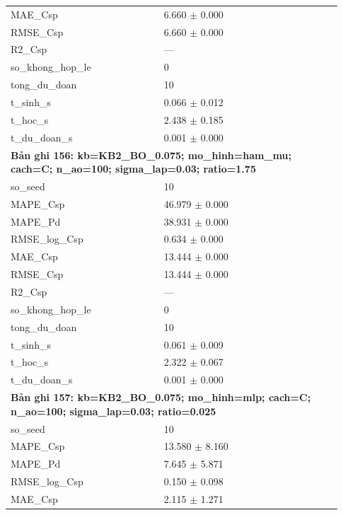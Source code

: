 \begin{longtable}{p{0.43\linewidth}p{0.50\linewidth}}
MAE\_\allowbreak Csp & 6.660 $\pm$ 0.000 \\
RMSE\_\allowbreak Csp & 6.660 $\pm$ 0.000 \\
R2\_\allowbreak Csp & — \\
so\_\allowbreak khong\_\allowbreak hop\_\allowbreak le & 0 \\
tong\_\allowbreak du\_\allowbreak doan & 10 \\
t\_\allowbreak sinh\_\allowbreak s & 0.066 $\pm$ 0.012 \\
t\_\allowbreak hoc\_\allowbreak s & 2.438 $\pm$ 0.185 \\
t\_\allowbreak du\_\allowbreak doan\_\allowbreak s & 0.001 $\pm$ 0.000 \\
\midrule
\multicolumn{2}{p{0.95\linewidth}}{\textbf{Bản ghi 156: kb=KB2\_BO\_0.075; mo\_hinh=ham\_mu; cach=C; n\_ao=100; sigma\_lap=0.03; ratio=1.75}} \\
so\_\allowbreak seed & 10 \\
MAPE\_\allowbreak Csp & 46.979 $\pm$ 0.000 \\
MAPE\_\allowbreak Pd & 38.931 $\pm$ 0.000 \\
RMSE\_\allowbreak log\_\allowbreak Csp & 0.634 $\pm$ 0.000 \\
MAE\_\allowbreak Csp & 13.444 $\pm$ 0.000 \\
RMSE\_\allowbreak Csp & 13.444 $\pm$ 0.000 \\
R2\_\allowbreak Csp & — \\
so\_\allowbreak khong\_\allowbreak hop\_\allowbreak le & 0 \\
tong\_\allowbreak du\_\allowbreak doan & 10 \\
t\_\allowbreak sinh\_\allowbreak s & 0.061 $\pm$ 0.009 \\
t\_\allowbreak hoc\_\allowbreak s & 2.322 $\pm$ 0.067 \\
t\_\allowbreak du\_\allowbreak doan\_\allowbreak s & 0.001 $\pm$ 0.000 \\
\midrule
\multicolumn{2}{p{0.95\linewidth}}{\textbf{Bản ghi 157: kb=KB2\_BO\_0.075; mo\_hinh=mlp; cach=C; n\_ao=100; sigma\_lap=0.03; ratio=0.025}} \\
so\_\allowbreak seed & 10 \\
MAPE\_\allowbreak Csp & 13.580 $\pm$ 8.160 \\
MAPE\_\allowbreak Pd & 7.645 $\pm$ 5.871 \\
RMSE\_\allowbreak log\_\allowbreak Csp & 0.150 $\pm$ 0.098 \\
MAE\_\allowbreak Csp & 2.115 $\pm$ 1.271 \\

\end{longtable}

